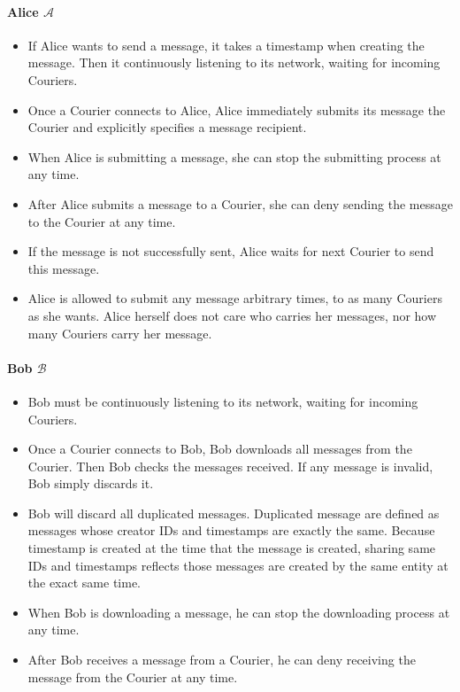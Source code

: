 \paragraph{Alice $\mathcal{A}$}
\begin{itemize}
\item If Alice wants to send a message, it takes a timestamp when creating the message. Then it continuously listening to its network, waiting for incoming Couriers.

\item Once a Courier connects to Alice, Alice immediately submits its message the Courier and explicitly specifies a message recipient.

\item When Alice is submitting a message, she can stop the submitting process at any time.

\item After Alice submits a message to a Courier, she can deny sending the message to the Courier at any time.

\item If the message is not successfully sent, Alice waits for next Courier to send this message.

\item Alice is allowed to submit any message arbitrary times, to as many Couriers as she wants. Alice herself does not care who carries her messages, nor how many Couriers carry her message.
\end{itemize}

\paragraph{Bob $\mathcal{B}$}
\begin{itemize}
\item Bob must be continuously listening to its network, waiting for incoming Couriers.

\item Once a Courier connects to Bob, Bob downloads all messages from the Courier. Then Bob checks the messages received. If any message is invalid, Bob simply discards it.

\item Bob will discard all duplicated messages. Duplicated message are defined as messages whose creator IDs and timestamps are exactly the same. Because timestamp is created at the time that the message is created, sharing same IDs and timestamps reflects those messages are created by the same entity at the exact same time.

\item When Bob is downloading a message, he can stop the downloading process at any time.

\item After Bob receives a message from a Courier, he can deny receiving the message from the Courier at any time.
\end{itemize}

